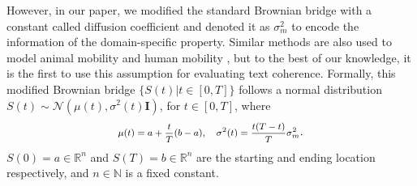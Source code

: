 \documentclass[letterpaper]{article}
\begin{document}
However, in our paper, we modified the standard Brownian bridge with a constant called diffusion coefficient and denoted it as $\sigma_m^2$ to encode the information of the domain-specific property. Similar methods are also used to model animal mobility \citep{Horne:2007aa} and human mobility \citep{John:2021}, but to the best of our knowledge, it is the first to use this assumption for evaluating text coherence. Formally, this modified Brownian bridge $\{S(t)|t\in [0,T]\}$ follows a normal distribution $S(t)\sim \mathcal{N}(\mu(t),\sigma^2(t) \mathbf{I})$, for $t\in[0,T]$, where
\[
\footnotesize
\begin{aligned}
\mu(t) = a + \frac{t}{T} (b-a),\quad \sigma^2(t)= \frac{t(T-t)}{T} \sigma^2_m
\end{aligned}
.\]
$S(0)=a \in \mathbb{R}^n$ and $S(T)=b\in \mathbb{R}^n$ are the starting and ending location respectively, and $n\in \mathbb{N}$ is a fixed constant.
\end{document}
